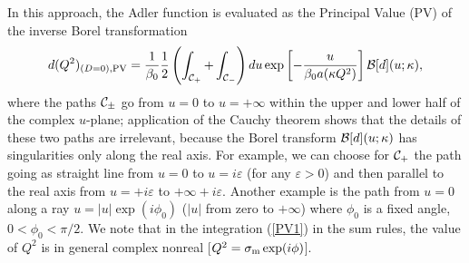 \documentclass[aps,nofootinbib,showkeys,noshowpacs,preprintnumbers,amsmath,amssymb]{revtex4}
\def\be{\begin{equation}}
\def\ee{\end{equation}}
\newcommand{\sm}{{\sigma_{\rm m}}}
\begin{document}
In this approach, the Adler function is evaluated as the Principal Value (PV) of the inverse Borel transformation
\be
d(Q^2)_{(D=0),{\rm PV}} = \frac{1}{\beta_0} \frac{1}{2} \left( \int_{{\cal C}_{+}} + \int_{{\cal C}_{-}} \right) d u \exp \left[ - \frac{u}{\beta_0 a(\kappa Q^2)} \right] {\cal B}[d](u; \kappa),
\label{PV1}
\ee
where the paths ${\cal C}_{\pm}$ go from $u=0$ to $u=+\infty$ within the upper and lower half of the complex $u$-plane; application of the Cauchy theorem shows that the details of these two paths are irrelevant, because the Borel transform $ {\cal B}[d](u; \kappa)$ has singularities only along the real axis. For example, we can choose for ${\cal C}_{+}$ the path going as straight line from $u=0$ to $u=i \varepsilon$ (for any $\varepsilon >0$) and then parallel to the real axis from $u=+i \varepsilon$ to $+\infty + i \varepsilon$. Another example is the path from $u=0$ along a ray $u=|u| \exp(i \phi_0)$ ($|u|$ from zero to $+\infty$) where $\phi_0$ is a fixed angle, $0 < \phi_0 < \pi/2$. We note that in the integration (\ref{PV1}) in the sum rules, the value of $Q^2$ is in general complex nonreal [$Q^2 = \sm \exp(i \phi)$].
\end{document}

